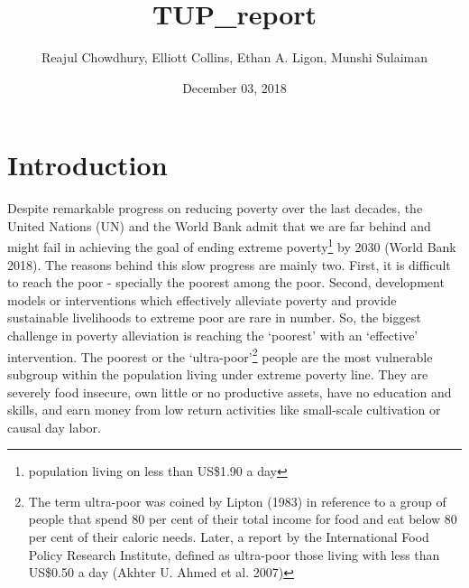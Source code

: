 \documentclass[]{article}
\title{TUP\_report}
\author{Reajul Chowdhury, Elliott Collins, Ethan A. Ligon, Munshi Sulaiman}
\date{December 03, 2018}
\let\rmarkdownfootnote\footnote%
\def\footnote{\protect\rmarkdownfootnote}
\begin{document}
\maketitle

\section{Introduction}\label{introduction}

Despite remarkable progress on reducing poverty over the last decades,
the United Nations (UN) and the World Bank admit that we are far behind
and might fail in achieving the goal of ending extreme poverty\footnote{population
  living on less than US\$1.90 a day} by 2030 (World Bank 2018). The
reasons behind this slow progress are mainly two. First, it is difficult
to reach the poor - specially the poorest among the poor. Second,
development models or interventions which effectively alleviate poverty
and provide sustainable livelihoods to extreme poor are rare in number.
So, the biggest challenge in poverty alleviation is reaching the
`poorest' with an `effective' intervention. The poorest or the
`ultra-poor'\footnote{The term ultra-poor was coined by Lipton (1983) in
  reference to a group of people that spend 80 per cent of their total
  income for food and eat below 80 per cent of their caloric needs.
  Later, a report by the International Food Policy Research Institute,
  defined as ultra-poor those living with less than US\$0.50 a day
  (Akhter U. Ahmed et al. 2007)} people are the most vulnerable subgroup
within the population living under extreme poverty line. They are
severely food insecure, own little or no productive assets, have no
education and skills, and earn money from low return activities like
small-scale cultivation or causal day labor.
\end{document}
